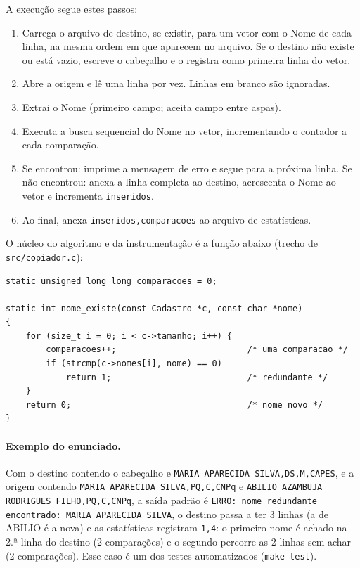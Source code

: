 \documentclass[11pt,a4paper]{article}
\begin{document}
A execução segue estes passos:
\begin{enumerate}[nosep]
  \item Carrega o arquivo de destino, se existir, para um vetor com o Nome de cada
        linha, na mesma ordem em que aparecem no arquivo. Se o destino não existe
        ou está vazio, escreve o cabeçalho e o registra como primeira linha do vetor.
  \item Abre a origem e lê uma linha por vez. Linhas em branco são ignoradas.
  \item Extrai o Nome (primeiro campo; aceita campo entre aspas).
  \item Executa a busca sequencial do Nome no vetor, incrementando o contador a
        cada comparação.
  \item Se encontrou: imprime a mensagem de erro e segue para a próxima linha.
        Se não encontrou: anexa a linha completa ao destino, acrescenta o Nome ao
        vetor e incrementa \texttt{inseridos}.
  \item Ao final, anexa \texttt{inseridos,comparacoes} ao arquivo de estatísticas.
\end{enumerate}

O núcleo do algoritmo e da instrumentação é a função abaixo (trecho de
\texttt{src/copiador.c}):
\begin{lstlisting}
static unsigned long long comparacoes = 0;

static int nome_existe(const Cadastro *c, const char *nome)
{
    for (size_t i = 0; i < c->tamanho; i++) {
        comparacoes++;                          /* uma comparacao */
        if (strcmp(c->nomes[i], nome) == 0)
            return 1;                           /* redundante */
    }
    return 0;                                   /* nome novo */
}
\end{lstlisting}

\paragraph{Exemplo do enunciado.} Com o destino contendo o cabeçalho e
\texttt{MARIA APARECIDA SILVA,DS,M,CAPES}, e a origem contendo
\texttt{MARIA APARECIDA SILVA,PQ,C,CNPq} e
\texttt{ABILIO AZAMBUJA RODRIGUES FILHO,PQ,C,CNPq}, a saída padrão é
\texttt{ERRO: nome redundante encontrado: MARIA APARECIDA SILVA}, o destino
passa a ter 3 linhas (a de ABILIO é a nova) e as estatísticas registram
\texttt{1,4}: o primeiro nome é achado na 2.ª linha do destino (2 comparações) e
o segundo percorre as 2 linhas sem achar (2 comparações). Esse caso é um dos
testes automatizados (\texttt{make test}).
\end{document}
